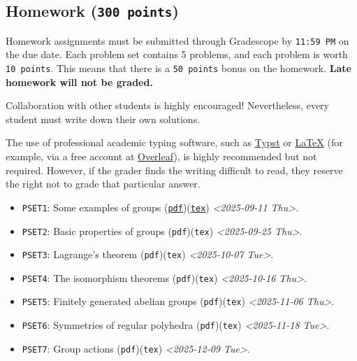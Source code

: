 \documentclass[11pt]{article}
\begin{document}
\subsection*{Homework (\texttt{300 points})}
\label{sec:org504e6ce}
Homework assignments must be submitted through Gradescope by \texttt{11:59 PM} on the
due date. Each problem set contains 5 problems, and each problem is worth \texttt{10
points}. This means that there is a \texttt{50 points} bonus on the homework. \textbf{Late
homework will not be graded.}

Collaboration with other students is highly encouraged! Nevertheless, every
student must write down their own solutions.

The use of professional academic typing software, such as \href{https://typst.app/}{Typst} or
\href{https://www.latex-project.org/}{\LaTeX{}} (for example, via a free account at \href{https://www.overleaf.com}{Overleaf}), is highly recommended
but not required. However, if the grader finds the writing difficult to read,
they reserve the right not to grade that particular answer.

\begin{itemize}
\item \texttt{PSET1}: Some examples of groups (\href{https://www.dropbox.com/scl/fi/b5i8ayu0mxpzt1sbj5l27/pset1.pdf?rlkey=o3916firn5vuidmhinecvd0ho\&dl=0}{\texttt{pdf}})(\href{https://www.dropbox.com/scl/fi/0uub9l5u6pso216iesn1o/pset1.tex?rlkey=cc1g4p7ltbzmbpzx6nofferut\&dl=0}{\texttt{tex}}) \textit{<2025-09-11 Thu>}.
\item \texttt{PSET2}: Basic properties of groups (\texttt{pdf})(\texttt{tex}) \textit{<2025-09-25 Thu>}.
\item \texttt{PSET3}: Lagrange's theorem (\texttt{pdf})(\texttt{tex}) \textit{<2025-10-07 Tue>}.
\item \texttt{PSET4}: The isomorphism theorems (\texttt{pdf})(\texttt{tex}) \textit{<2025-10-16 Thu>}.
\item \texttt{PSET5}: Finitely generated abelian groups (\texttt{pdf})(\texttt{tex}) \textit{<2025-11-06 Thu>}.
\item \texttt{PSET6}: Symmetries of regular polyhedra (\texttt{pdf})(\texttt{tex}) \textit{<2025-11-18 Tue>}.
\item \texttt{PSET7}: Group actions (\texttt{pdf})(\texttt{tex}) \textit{<2025-12-09 Tue>}.
\end{itemize}
\end{document}
